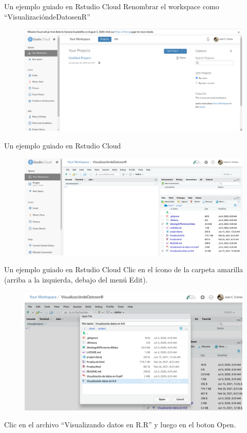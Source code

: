 \documentclass{beamer}
\begin{document}
\begin{frame}{Un ejemplo guiado en Rstudio Cloud}
Renombrar el workspace como ``VisualizacióndeDatosenR'' 
\begin{figure}
\centering
\includegraphics[width=1\textwidth]{PantallaInicial.png}
\end{figure}  
\end{frame}

\begin{frame}{Un ejemplo guiado en Rstudio Cloud}
\begin{figure}
\centering
\includegraphics[width=1\textwidth]{PantallaModificada.png}
\end{figure}  
\end{frame}

\begin{frame}{Un ejemplo guiado en Rstudio Cloud}
Clic en el ícono de la carpeta amarilla (arriba a la izquierda, debajo del menú Edit).
\begin{figure}
\centering
\includegraphics[width=.7\textwidth]{AbrirScript.png}
\end{figure}  
Clic en el archivo ``Visualizando datos en R.R'' y luego en el boton Open.
\end{frame}
\end{document}
